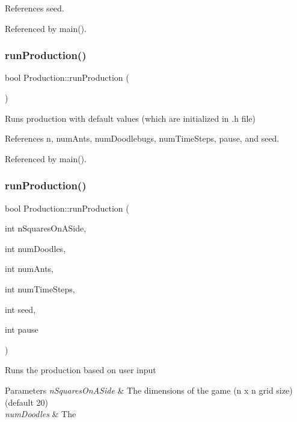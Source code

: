 References seed.



Referenced by main().

\mbox{\label{classProduction_a1d66853eafae2580089eff44f12f07ba}} 
\subsubsection{run\+Production()\hspace{0.1cm}{\footnotesize\ttfamily [1/2]}}
{\footnotesize\ttfamily bool Production\+::run\+Production (\begin{DoxyParamCaption}{ }\end{DoxyParamCaption})}

Runs production with default values (which are initialized in .h file) 

References n, num\+Ants, num\+Doodlebugs, num\+Time\+Steps, pause, and seed.



Referenced by main().

\mbox{\label{classProduction_a758671d90a552cdf37306fe179891f28}} 
\subsubsection{run\+Production()\hspace{0.1cm}{\footnotesize\ttfamily [2/2]}}
{\footnotesize\ttfamily bool Production\+::run\+Production (\begin{DoxyParamCaption}\item[{int}]{n\+Squares\+On\+A\+Side,  }\item[{int}]{num\+Doodles,  }\item[{int}]{num\+Ants,  }\item[{int}]{num\+Time\+Steps,  }\item[{int}]{seed,  }\item[{int}]{pause }\end{DoxyParamCaption})}

Runs the production based on user input 
\begin{DoxyParams}{Parameters}
{\em n\+Squares\+On\+A\+Side} & The dimensions of the game (n x n grid size) (default 20) \\
\hline
{\em num\+Doodles} & The \\
\hline
\end{DoxyParams}


